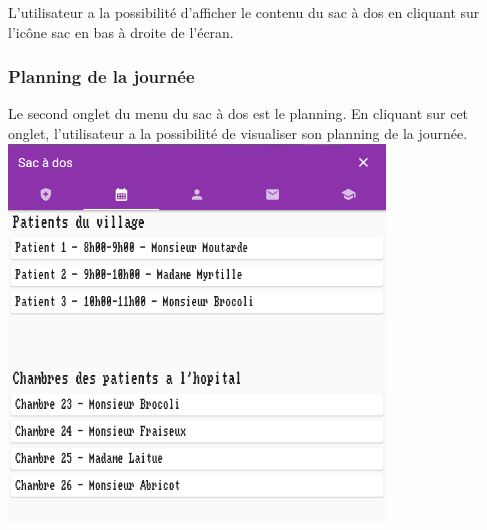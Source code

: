 L'utilisateur a la possibilité d'afficher le contenu du sac à dos en cliquant sur l'icône sac en bas à droite de l'écran.



\subsubsection*{Planning de la journée}

Le second onglet du menu du sac à dos est le planning. En cliquant sur cet onglet, l'utilisateur a la possibilité de visualiser son planning de la journée. \\

\includegraphics[height=10cm]{images/toolsMenu/planning_screenshot.png}

